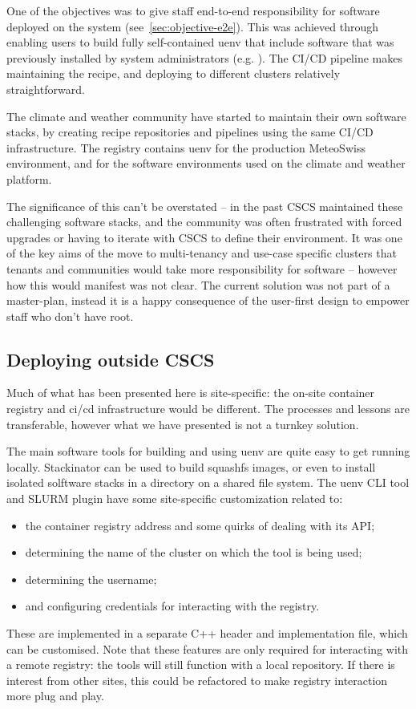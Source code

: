 One of the objectives was to give staff end-to-end responsibility for software deployed on the system (see~\ref{sec:objective-e2e}).
This was achieved through enabling users to build fully self-contained uenv that include software that was previously installed by system administrators (e.g. ).
The CI/CD pipeline makes maintaining the recipe, and deploying to different clusters relatively straightforward.

The climate and weather community have started to maintain their own software stacks, by creating recipe repositories and pipelines using the same CI/CD infrastructure.
The registry contains uenv for the production MeteoSwiss environment, and for the software environments used on the climate and weather platform.

The significance of this can't be overstated -- in the past CSCS maintained these challenging software stacks, and the community was often frustrated with forced upgrades or having to iterate with CSCS to define their environment.
It was one of the key aims of the move to multi-tenancy and use-case specific clusters that tenants and communities would take more responsibility for software -- however how this would manifest was not clear.
The current solution was not part of a master-plan, instead it is a happy consequence of the user-first design to empower staff who don't have root.

\subsection{Deploying outside CSCS}
\label{sec:discuss-site}

Much of what has been presented here is site-specific: the on-site container registry and ci/cd infrastructure would be different.
The processes and lessons are transferable, however what we have presented is not a turnkey solution.

The main software tools for building and using uenv are quite easy to get running locally.
Stackinator can be used to build squashfs images, or even to install isolated solftware stacks in a directory on a shared file system.
The uenv CLI tool and SLURM plugin have some site-specific customization related to:
\begin{itemize}
    \item the container registry address and some quirks of dealing with its API;
    \item determining the name of the cluster on which the tool is being used;
    \item determining the username;
    \item and configuring credentials for interacting with the registry.
\end{itemize}
These are implemented in a separate C++ header and implementation file, which can be customised.
Note that these features are only required for interacting with a remote registry: the tools will still function with a local repository.
If there is interest from other sites, this could be refactored to make registry interaction more plug and play.

